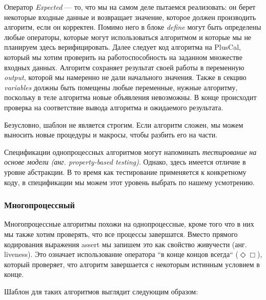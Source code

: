 \documentclass[14pt, openany]{report}
\begin{document}
Оператор \emph{Expected} --- то, что мы на самом деле пытаемся реализовать: он берет некоторые входные данные и возвращает значение, которое должен производить алгоритм, если он корректен. Помимо него в блоке \emph{define} могут быть определены любые операторы, которые могут использоваться алгоритмом и которые мы не планируем здесь верифицировать. Далее следует код алгоритма на PlusCal, который мы хотим проверить на работоспособность на заданном множестве входных данных. Алгоритм сохраняет результат своей работы в переменную \emph{output}, которой мы намеренно не дали начального значения. Также в секцию \emph{variables} должны быть помещены любые переменные, нужные алгоритму, поскольку в теле алгоритма новые объявления невозможны. В конце происходит проверка на соответствие вывода алгоритма и ожидаемого результата.

Безусловно, шаблон не является строгим. Если алгоритм сложен, мы можем выносить новые процедуры и макросы, чтобы разбить его на части.

Спецификации однопроцессных алгоритмов могут напоминать \emph{тестирование на основе модели (анг. property-based testing)}. Однако, здесь имеется отличие в уровне абстракции. В то время как тестирование применяется к конкретному коду, в спецификации мы можем этот уровень выбрать по нашему усмотрению.

\subsubsection{Многопроцессный}

Многопроцессные алгоритмы похожи на однопроцессные, кроме того что в них мы также хотим проверять, что все процессы завершатся. Вместо прямого кодирования выражения assert мы запишем это как свойство живучести (анг. liveness). Это означает использование оператора ``в конце концов всегда`` (\(\Diamond \Box\)), который проверяет, что алгоритм завершается с некоторым истинным условием в конце.

Шаблон для таких алгоритмов выглядит следующим образом:
\end{document}
